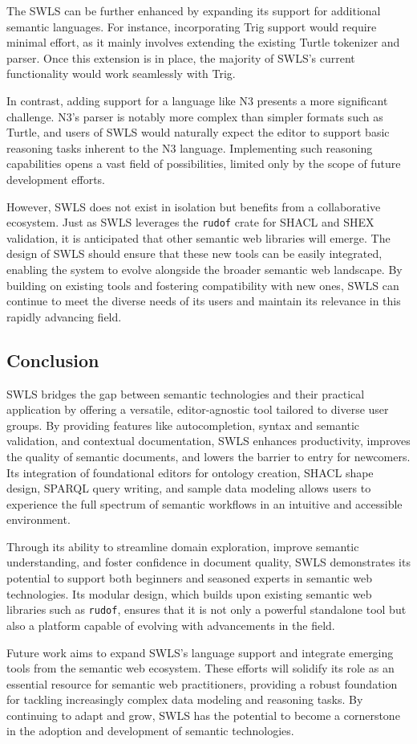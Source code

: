 The SWLS can be further enhanced by expanding its support for additional semantic languages.
For instance, incorporating Trig support would require minimal effort, as it mainly involves extending the existing Turtle tokenizer and parser.
Once this extension is in place, the majority of SWLS’s current functionality would work seamlessly with Trig.

In contrast, adding support for a language like N3 presents a more significant challenge.
N3’s parser is notably more complex than simpler formats such as Turtle, and users of SWLS would naturally expect the editor to support basic reasoning tasks inherent to the N3 language.
Implementing such reasoning capabilities opens a vast field of possibilities, limited only by the scope of future development efforts.

However, SWLS does not exist in isolation but benefits from a collaborative ecosystem.
Just as SWLS leverages the \texttt{rudof} crate for SHACL and SHEX validation, it is anticipated that other semantic web libraries will emerge.
The design of SWLS should ensure that these new tools can be easily integrated, enabling the system to evolve alongside the broader semantic web landscape.
By building on existing tools and fostering compatibility with new ones, SWLS can continue to meet the diverse needs of its users and maintain its relevance in this rapidly advancing field.


\subsection{Conclusion}

SWLS bridges the gap between semantic technologies and their practical application by offering a versatile, editor-agnostic tool tailored to diverse user groups.
By providing features like autocompletion, syntax and semantic validation, and contextual documentation, SWLS enhances productivity, improves the quality of semantic documents, and lowers the barrier to entry for newcomers.
Its integration of foundational editors for ontology creation, SHACL shape design, SPARQL query writing, and sample data modeling allows users to experience the full spectrum of semantic workflows in an intuitive and accessible environment.

Through its ability to streamline domain exploration, improve semantic understanding, and foster confidence in document quality, SWLS demonstrates its potential to support both beginners and seasoned experts in semantic web technologies.
Its modular design, which builds upon existing semantic web libraries such as \texttt{rudof}, ensures that it is not only a powerful standalone tool but also a platform capable of evolving with advancements in the field.

Future work aims to expand SWLS’s language support and integrate emerging tools from the semantic web ecosystem.
These efforts will solidify its role as an essential resource for semantic web practitioners, providing a robust foundation for tackling increasingly complex data modeling and reasoning tasks.
By continuing to adapt and grow, SWLS has the potential to become a cornerstone in the adoption and development of semantic technologies.


